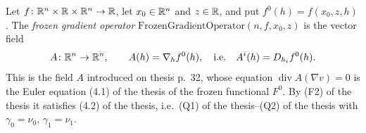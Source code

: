 \begin{definition}
Let $f\colon\mathbb{R}^n\times\mathbb{R}\times\mathbb{R}^n\to\mathbb{R}$, let $x_0\in\mathbb{R}^n$ and $z\in\mathbb{R}$, and put
$f^0(h)=f(x_0,z,h)$.  The \emph{frozen gradient operator}
$\mathrm{FrozenGradientOperator}(n,f,x_0,z)$ is the vector field
\[
A\colon\mathbb{R}^n\to\mathbb{R}^n,\qquad A(h)=\nabla_hf^0(h),\quad\text{i.e.}\quad A^i(h)=D_{h_i}f^0(h) .
\]
This is the field $A$ introduced on thesis p.~32, whose equation
$\operatorname{div}A(\nabla v)=0$ is the Euler equation (4.1) of the thesis of the
frozen functional $F^0$.  By (F2) of the thesis it satisfies (4.2) of the thesis, i.e.\
(Q1) of the thesis--(Q2) of the thesis with $\gamma_0=\nu_0$, $\gamma_1=\nu_1$.
\end{definition}
